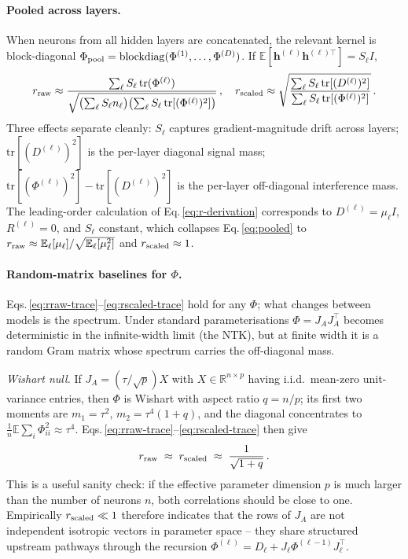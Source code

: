 \documentclass[10pt]{article}
\newcommand{\vh}{\mathbf{h}}
\begin{document}
\paragraph{Pooled across layers.}
When neurons from all hidden layers are concatenated, the relevant kernel is block-diagonal $\Phi_{\rm pool}=\mathrm{blockdiag}(\Phi^{(1)},\dots,\Phi^{(D)})$.  If $\mathbb{E}[\vh^{(\ell)}\vh^{(\ell)\top}]=S_\ell I$,
\begin{equation}\label{eq:pooled}
  r_{\rm raw}
  \approx
  \frac{\sum_\ell S_\ell\,\mathrm{tr}(\Phi^{(\ell)})}
       {\sqrt{\bigl(\sum_\ell S_\ell n_\ell\bigr)\bigl(\sum_\ell S_\ell\,\mathrm{tr}[(\Phi^{(\ell)})^2]\bigr)}}\,,
  \quad
  r_{\rm scaled}
  \approx
  \sqrt{\frac{\sum_\ell S_\ell\,\mathrm{tr}[(D^{(\ell)})^2]}{\sum_\ell S_\ell\,\mathrm{tr}[(\Phi^{(\ell)})^2]}}\,.
\end{equation}
Three effects separate cleanly: $S_\ell$ captures gradient-magnitude drift across layers; $\mathrm{tr}[(D^{(\ell)})^2]$ is the per-layer diagonal signal mass; $\mathrm{tr}[(\Phi^{(\ell)})^2]-\mathrm{tr}[(D^{(\ell)})^2]$ is the per-layer off-diagonal interference mass.  The leading-order calculation of Eq.\,\ref{eq:r-derivation} corresponds to $D^{(\ell)}=\mu_\ell I$, $R^{(\ell)}=0$, and $S_\ell$ constant, which collapses Eq.\,\ref{eq:pooled} to $r_{\rm raw}\approx \mathbb{E}_\ell[\mu_\ell]/\sqrt{\mathbb{E}_\ell[\mu_\ell^2]}$ and $r_{\rm scaled}\approx 1$.

\paragraph{Random-matrix baselines for $\Phi$.}
Eqs.\,\ref{eq:rraw-trace}--\ref{eq:rscaled-trace} hold for any $\Phi$; what changes between models is the spectrum.  Under standard parameterisations $\Phi=J_A J_A^{\!\top}$ becomes deterministic in the infinite-width limit (the NTK), but at finite width it is a random Gram matrix whose spectrum carries the off-diagonal mass.

\emph{Wishart null.}  If $J_A=(\tau/\sqrt{p})X$ with $X\in\mathbb{R}^{n\times p}$ having i.i.d.\ mean-zero unit-variance entries, then $\Phi$ is Wishart with aspect ratio $q=n/p$; its first two moments are $m_1=\tau^2$, $m_2=\tau^4(1+q)$, and the diagonal concentrates to $\frac{1}{n}\mathbb{E}\!\sum_i\Phi_{ii}^2\approx\tau^4$.  Eqs.\,\ref{eq:rraw-trace}--\ref{eq:rscaled-trace} then give
\[
  r_{\rm raw}\;\approx\;r_{\rm scaled}\;\approx\;\frac{1}{\sqrt{1+q}}\,.
\]
This is a useful sanity check: if the effective parameter dimension $p$ is much larger than the number of neurons $n$, both correlations should be close to one.  Empirically $r_{\rm scaled}\ll 1$ therefore indicates that the rows of $J_A$ are not independent isotropic vectors in parameter space -- they share structured upstream pathways through the recursion $\Phi^{(\ell)}=D_\ell+J_\ell\Phi^{(\ell-1)}J_\ell^{\!\top}$.
\end{document}
